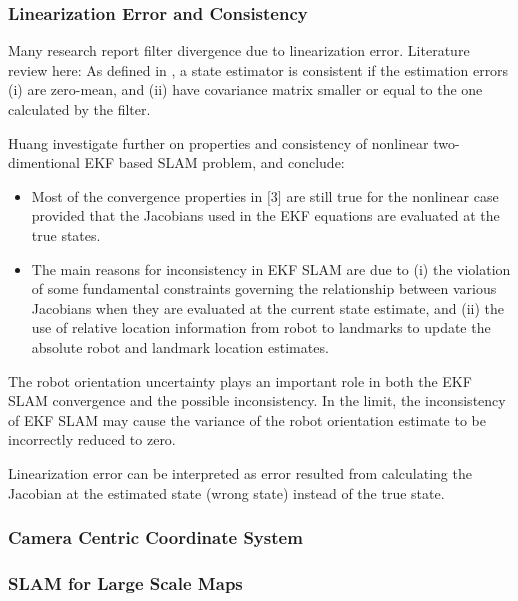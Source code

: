\subsubsection{Linearization Error and Consistency}
\label{sec:Linearization_error_and_consistency}

Many research report filter divergence due to linearization error. 
Literature review here:
As defined in \cite{Huang_2008}, a state estimator is consistent
if the estimation errors (i) are zero-mean, and (ii) have
covariance matrix smaller or equal to the one calculated by the filter.

Huang investigate further on properties and consistency of nonlinear 
two-dimentional EKF based SLAM problem, and conclude:

\begin{itemize}
  \item Most of the convergence properties in $[$3$]$ are still true for 
  the nonlinear case provided that the Jacobians used in the EKF equations 
  are evaluated at the true states.
  \item The main reasons for inconsistency in EKF SLAM are due to (i) the 
  violation of some fundamental constraints governing the relationship 
  between various Jacobians when they are evaluated at the current state 
  estimate, and (ii) the use of relative location information from robot 
  to landmarks to update the absolute robot and landmark location 
  estimates.
\end{itemize}

The robot orientation uncertainty plays an important role in both the 
EKF SLAM convergence and the possible inconsistency. In the limit, the 
inconsistency of EKF SLAM may cause the variance of the robot 
orientation estimate to be incorrectly reduced to zero.

Linearization error can be interpreted as error resulted from 
calculating the Jacobian at the estimated state (wrong state) instead of 
the true state. 

\subsubsection{Camera Centric Coordinate System}
\label{sec:cam_centric}

\subsubsection{SLAM for Large Scale Maps}
